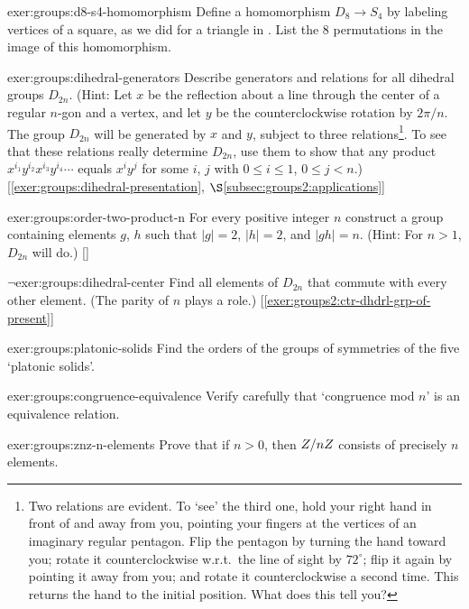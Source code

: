 \begin{exer}{}{exer:groups:d8-s4-homomorphism}
  Define a homomorphism $D_8 \to S_4$ by labeling vertices of a
  square, as we did for a triangle in
  . List the $8$ permutations
  in the image of this homomorphism.
\end{exer}
\begin{exer}{\exerused}{exer:groups:dihedral-generators}
  Describe generators and relations for all dihedral groups
  $D_{2n}$. (Hint: Let $x$ be the reflection about a line through the
  center of a regular $n$-gon and a vertex, and let $y$ be the
  counterclockwise rotation by $2\pi/n$. The group $D_{2n}$ will be
  generated by $x$ and $y$, subject to three relations\footnote{Two
    relations are evident. To `see' the third one, hold your right
    hand in front of and away from you, pointing your fingers at the
    vertices of an imaginary regular pentagon. Flip the pentagon by
    turning the hand toward you; rotate it counterclockwise w.r.t.\
    the line of sight by $72^\circ$; flip it again by pointing it away
    from you; and rotate it counterclockwise a second time. This
    returns the hand to the initial position. What does this tell
    you?}.  To see that these relations really determine $D_{2n}$, use
  them to show that any product
  $x^{i_1} y^{i_2} x^{i_3} y^{i_4} \cdots$ equals $x^i y^j$ for some
  $i$, $j$ with $0 \leq i \leq 1$, $0 \leq j < n$.)
  [\ref{exer:groups:dihedral-presentation},
  $\S$\ref{subsec:groups2:applications}]
\end{exer}
\begin{exer}{\exerused}{exer:groups:order-two-product-n}
  For every positive integer $n$ construct a group containing elements
  $g$, $h$ such that $|g| = 2$, $|h| = 2$, and $|gh| = n$. (Hint: For
  $n > 1$, $D_{2n}$ will do.) [\Cref{subsec:groups:order}]
\end{exer}

\begin{exer}{$\lnot$}{exer:groups:dihedral-center}
  Find all elements of $D_{2n}$ that commute with every other
  element. (The parity of $n$ plays a role.)
  [\ref{exer:groups2:ctr-dhdrl-grp-of-present}]
\end{exer}

\begin{exer}{}{exer:groups:platonic-solids}
  Find the orders of the groups of symmetries of the five `platonic
  solids'.
\end{exer}

\begin{exer}{}{exer:groups:congruence-equivalence}
  Verify carefully that `congruence mod $n$' is an equivalence
  relation.
\end{exer}
\begin{exer}{}{exer:groups:znz-n-elements}
  Prove that if $n > 0$, then $Z/nZ$ consists of precisely $n$
  elements.
\end{exer}

